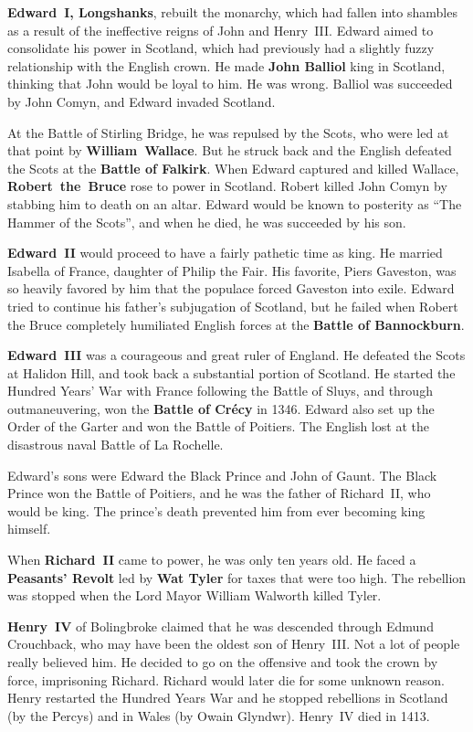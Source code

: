\textbf{Edward~I, Longshanks}, rebuilt the monarchy,
which had fallen into shambles as a result of the ineffective reigns of John and Henry~III\@.
Edward aimed to consolidate his power in Scotland,
which had previously had a slightly fuzzy relationship with the English crown.
He made \textbf{John Balliol} king in Scotland, thinking that John would be loyal to him.
He was wrong.
Balliol was succeeded by John Comyn, and Edward invaded Scotland.

At the Battle of Stirling Bridge, he was repulsed by the Scots,
who were led at that point by \textbf{William~Wallace}.
But he struck back and the English defeated the Scots at the \textbf{Battle of Falkirk}.
When Edward captured and killed Wallace, \textbf{Robert~the~Bruce} rose to power in Scotland.
Robert killed John Comyn by stabbing him to death on an altar.
Edward would be known to posterity as ``The Hammer of the Scots'',
and when he died, he was succeeded by his son.

\textbf{Edward~II} would proceed to have a fairly pathetic time as king.
He married Isabella of France, daughter of Philip the Fair.
His favorite, Piers Gaveston, was so heavily favored by him that the populace forced Gaveston into exile.
Edward tried to continue his father's subjugation of Scotland,
but he failed when Robert the Bruce completely humiliated English forces at the \textbf{Battle of Bannockburn}.

\textbf{Edward~III} was a courageous and great ruler of England.
He defeated the Scots at Halidon Hill, and took back a substantial portion of Scotland.
He started the Hundred Years' War with France following the Battle of Sluys,
and through outmaneuvering, won the \textbf{Battle of Cr\'ecy} in 1346.
Edward also set up the Order of the Garter and won the Battle of Poitiers.
The English lost at the disastrous naval Battle of La Rochelle.

Edward's sons were Edward the Black Prince and John of Gaunt.
The Black Prince won the Battle of Poitiers, and he was the father of Richard~II, who would be king.
The prince's death prevented him from ever becoming king himself.

When \textbf{Richard~II} came to power, he was only ten years old.
He faced a \textbf{Peasants' Revolt} led by \textbf{Wat Tyler} for taxes that were too high.
The rebellion was stopped when the Lord Mayor William Walworth killed Tyler.

\textbf{Henry~IV} of Bolingbroke claimed that he was descended through Edmund Crouchback,
who may have been the oldest son of Henry~III\@.
Not a lot of people really believed him.
He decided to go on the offensive and took the crown by force, imprisoning Richard.
Richard would later die for some unknown reason.
Henry restarted the Hundred Years War and he stopped rebellions
in Scotland (by the Percys) and in Wales (by Owain Glyndwr).
Henry~IV died in 1413.

